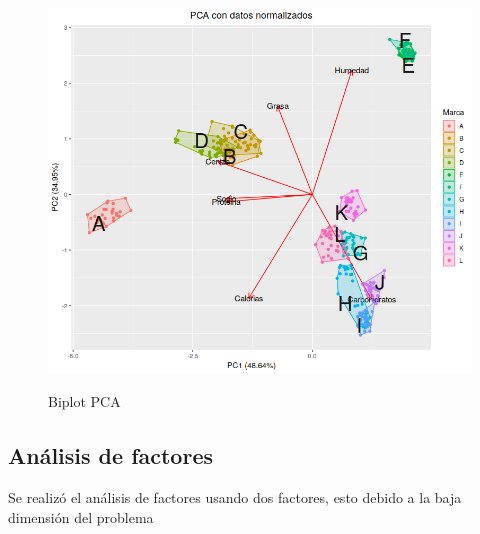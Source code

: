 \begin{figure}[h]
\centering
	\includegraphics[scale=.75]{images/biplotPCA.png} 
	\label{i_biplot_PCA}
	\caption{Biplot PCA}
\end{figure}


\subsection{Análisis de factores}

Se realizó el análisis de factores usando dos factores, esto debido a la baja dimensión del problema